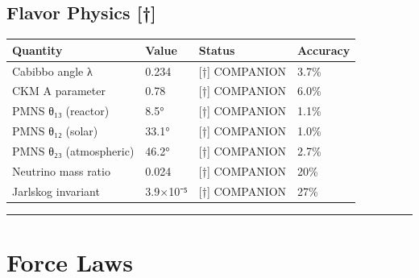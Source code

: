 \documentclass[
  11pt,
  letterpaper,
  twoside,
  openright]{book}
\begin{document}
\subsection{Flavor Physics {[}†{]}}\label{flavor-physics}

\begin{longtable}[]{@{}llll@{}}
\toprule\noalign{}
Quantity & Value & Status & Accuracy \\
\midrule\noalign{}
\endhead
\bottomrule\noalign{}
\endlastfoot
Cabibbo angle λ & 0.234 & {[}†{]} COMPANION & 3.7\% \\
CKM A parameter & 0.78 & {[}†{]} COMPANION & 6.0\% \\
PMNS θ₁₃ (reactor) & 8.5° & {[}†{]} COMPANION & 1.1\% \\
PMNS θ₁₂ (solar) & 33.1° & {[}†{]} COMPANION & 1.0\% \\
PMNS θ₂₃ (atmospheric) & 46.2° & {[}†{]} COMPANION & 2.7\% \\
Neutrino mass ratio & 0.024 & {[}†{]} COMPANION & 20\% \\
Jarlskog invariant & 3.9×10⁻⁵ & {[}†{]} COMPANION & 27\% \\
\end{longtable}

\begin{center}\rule{0.5\linewidth}{0.5pt}\end{center}

\section{Force Laws}\label{force-laws}
\end{document}

